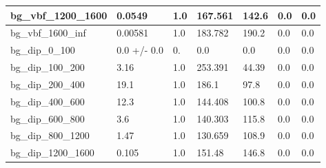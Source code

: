 \documentclass[a4paper, 10pt]{article}
\begin{document}
\begin{table}[H]
\begin{center}
\begin{tabular}{|m{23.0mm}|m{23.0mm}|m{18.0mm}|m{19.0mm}|m{19.0mm}|m{19.0mm}|m{19.0mm}|}
      \hline
      {\cellcolor{white}         bg\_vbf\_1200\_1600}& {\cellcolor{white}         0.0549}& {\cellcolor{white}         1.0}& {\cellcolor{white}         167.561}& {\cellcolor{white}         142.6}& {\cellcolor{green}         0.0}& {\cellcolor{green}         0.0}\\
      \hline
      {\cellcolor{white}         bg\_vbf\_1600\_inf}& {\cellcolor{white}         0.00581}& {\cellcolor{white}         1.0}& {\cellcolor{white}         183.782}& {\cellcolor{white}         190.2}& {\cellcolor{green}         0.0}& {\cellcolor{green}         0.0}\\
      \hline
      {\cellcolor{white}         bg\_dip\_0\_100}& {\cellcolor{white}         0.0 +/\-- 0.0}& {\cellcolor{white}         0.}& {\cellcolor{white}         0.0}& {\cellcolor{white}         0.0}& {\cellcolor{green}         0.0}& {\cellcolor{green}         0.0}\\
      \hline
      {\cellcolor{white}         bg\_dip\_100\_200}& {\cellcolor{white}         3.16}& {\cellcolor{white}         1.0}& {\cellcolor{white}         253.391}& {\cellcolor{white}         44.39}& {\cellcolor{green}         0.0}& {\cellcolor{green}         0.0}\\
      \hline
      {\cellcolor{white}         bg\_dip\_200\_400}& {\cellcolor{white}         19.1}& {\cellcolor{white}         1.0}& {\cellcolor{white}         186.1}& {\cellcolor{white}         97.8}& {\cellcolor{green}         0.0}& {\cellcolor{green}         0.0}\\
      \hline
      {\cellcolor{white}         bg\_dip\_400\_600}& {\cellcolor{white}         12.3}& {\cellcolor{white}         1.0}& {\cellcolor{white}         144.408}& {\cellcolor{white}         100.8}& {\cellcolor{green}         0.0}& {\cellcolor{green}         0.0}\\
      \hline
      {\cellcolor{white}         bg\_dip\_600\_800}& {\cellcolor{white}         3.6}& {\cellcolor{white}         1.0}& {\cellcolor{white}         140.303}& {\cellcolor{white}         115.8}& {\cellcolor{green}         0.0}& {\cellcolor{green}         0.0}\\
      \hline
      {\cellcolor{white}         bg\_dip\_800\_1200}& {\cellcolor{white}         1.47}& {\cellcolor{white}         1.0}& {\cellcolor{white}         130.659}& {\cellcolor{white}         108.9}& {\cellcolor{green}         0.0}& {\cellcolor{green}         0.0}\\
      \hline
      {\cellcolor{white}         bg\_dip\_1200\_1600}& {\cellcolor{white}         0.105}& {\cellcolor{white}         1.0}& {\cellcolor{white}         151.48}& {\cellcolor{white}         146.8}& {\cellcolor{green}         0.0}& {\cellcolor{green}         0.0}\\

\end{tabular}
\end{center}
\end{table}
\end{document}
